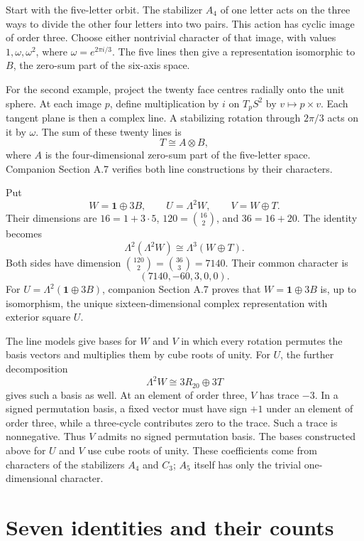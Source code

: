 \documentclass[11pt,a4paper]{article}
\begin{document}
Start with the five-letter orbit. The stabilizer $A_4$ of one letter acts on the three ways to divide the
other four letters into two pairs. This action has cyclic image of order three. Choose either nontrivial
character of that image, with values $1,\omega,\omega^2$, where
$\omega=e^{2\pi i/3}$. The five lines then give a representation
isomorphic to $B$, the zero-sum part of the six-axis space.

For the second example, project the twenty face centres radially onto the unit sphere. At each image $p$, define multiplication by $i$ on $T_pS^2$ by $v\mapsto p\times v$. Each tangent plane is then a complex line.
A stabilizing rotation through $2\pi/3$ acts on it by $\omega$.
The sum of these twenty lines is
\[
T\cong A\otimes B,
\]
where $A$ is the four-dimensional zero-sum part of the five-letter space.
Companion Section A.7 verifies both line
constructions by their characters.

Put
\[
W=\mathbf1\oplus3B,\qquad
U=\Lambda^2W,\qquad V=W\oplus T.
\]
Their dimensions are $16=1+3\cdot5$, $120=\binom{16}{2}$, and
$36=16+20$. The identity becomes
\begin{equation}\label{eq:lines-7140}
\boxed{\Lambda^2(\Lambda^2W)\cong\Lambda^3(W\oplus T).}
\end{equation}
Both sides have dimension $\binom{120}{2}=\binom{36}{3}=7140$.
Their common character is
\[
(7140,-60,3,0,0).
\]
For $U=\Lambda^2(\mathbf1\oplus3B)$, companion Section A.7 proves that $W=\mathbf1\oplus3B$ is, up to isomorphism, the unique sixteen-dimensional complex representation with exterior square $U$.

The line models give bases for $W$ and $V$ in which every rotation
permutes the basis vectors and multiplies them by cube roots of unity.
For $U$, the further decomposition
\[
\Lambda^2W\cong3R_{20}\oplus3T
\]
gives such a basis as well. At an element of order three, $V$ has trace $-3$.
In a signed permutation basis, a fixed vector must have sign $+1$
under an element of order three, while a three-cycle contributes zero
to the trace. Such a trace is nonnegative. Thus $V$ admits no signed permutation basis. The bases constructed above for $U$ and $V$ use cube roots of unity.
These coefficients come from characters of the stabilizers $A_4$ and
$C_3$; $A_5$ itself has only the trivial one-dimensional character.

\section{Seven identities and their counts}\label{sec:counts}
\end{document}
